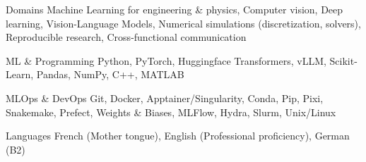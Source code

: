 

\begin{cvskills}

  \cvskill
    {Domains} %
    {Machine Learning for engineering \& physics, Computer vision, Deep learning, Vision-Language Models, Numerical simulations (discretization, solvers), Reproducible research, Cross-functional communication} %

  \cvskill
    {ML \& Programming} %
    {Python, PyTorch, Huggingface Transformers, vLLM, Scikit-Learn, Pandas, NumPy, C++, MATLAB} %

  \cvskill
    {MLOps \& DevOps} %
    {Git, Docker, Apptainer/Singularity, Conda, Pip, Pixi, Snakemake, Prefect, Weights \& Biases, MLFlow, Hydra, Slurm, Unix/Linux} %

  \cvskill
    {Languages} %
    {French (Mother tongue), English (Professional proficiency), German (B2)} %

\end{cvskills}
